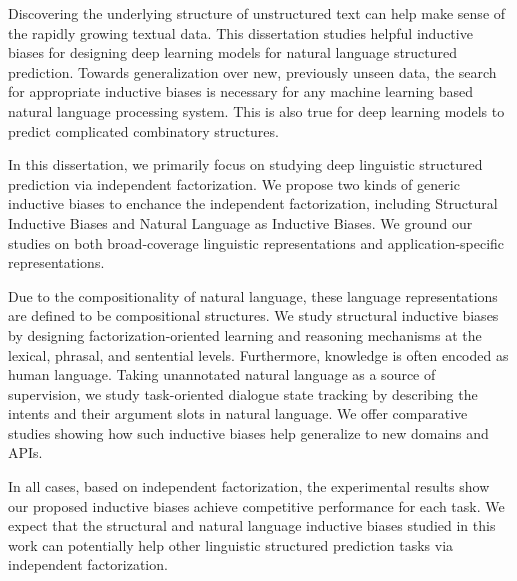 
Discovering the underlying structure of unstructured text can help
make sense of the rapidly growing textual data. This dissertation studies
helpful inductive biases for designing deep learning models for
natural language structured prediction. Towards generalization over
new, previously unseen data, the search for appropriate inductive
biases is necessary for any machine learning based natural language
processing system. This is also true for deep learning models to
predict complicated combinatory structures.

In this dissertation, we primarily focus on studying deep linguistic
structured prediction via independent factorization. We propose two
kinds of generic inductive biases to enchance the independent
factorization, including Structural Inductive Biases and
Natural Language as Inductive Biases.  We ground our studies on
both broad-coverage linguistic representations and
application-specific representations.

Due to the compositionality of natural language, these language
representations are defined to be compositional structures. We study
structural inductive biases by designing factorization-oriented
learning and reasoning mechanisms at the lexical, phrasal, and
sentential levels. Furthermore, knowledge is often encoded as human
language. Taking unannotated natural language as a source of
supervision, we study task-oriented dialogue state tracking by
describing the intents and their argument slots in natural
language. We offer comparative studies showing how such inductive
biases help generalize to new domains and APIs.

In all cases, based on independent factorization, the experimental
results show our proposed inductive biases achieve competitive
performance for each task. We expect that the structural and natural
language inductive biases studied in this work can potentially help
other linguistic structured prediction tasks via independent
factorization.

